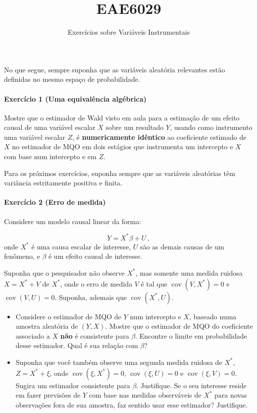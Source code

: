 \documentclass[10pt,a4paper]{article}
\title{EAE6029}
\author{Exercícios sobre Variáveis Instrumentais}
\date{}
\begin{document}
	\maketitle
	No que segue, sempre suponha que as variáveis aleatória relevantes estão definidas no mesmo espaço de probabilidade.
 \paragraph{Exercício 1 (Uma equivalência algébrica)} Mostre que o estimador de Wald visto em aula para a estimação de um efeito causal de uma variável escalar $X$ sobre um resultado $Y$, usando como instrumento uma variável escalar $Z$, é \textbf{numericamente idêntico} ao coeficiente estimado de $X$ no estimador de MQO em dois estágios que instrumenta um intercepto e $X$ com base num intercepto e em $Z$.
 
 \vspace{1em}
 		Para os próximos exercícios, suponha sempre que as variáveis aleatórias têm variância estritamente positiva e finita.
 
	\paragraph{Exercício 2 (Erro de medida)} Considere um modelo causal linear da forma:

$$Y = X^* \beta + U\, ,$$
onde $X^*$ é uma causa escalar de interesse, $U$ são as demais causas de um fenômeno, e $\beta$ é um efeito causal de interesse. 

Suponha que o pesquisador não observe $X^*$, mas somente uma medida ruidosa $X = X^* + V$ de $X^*$, onde o erro de medida $V$ é tal que $\operatorname{cov}(V,X^*) = 0$ e $\operatorname{cov}(V, U)=0$. Suponha, ademais que $\operatorname{cov}(X^*,U)$.

\begin{itemize}
	\item[a] Considere o estimador de MQO de $Y$ num intercepto e $X$, baseado numa amostra aleatória de $(Y,X)$. Mostre que o estimador de MQO do coeficiente associado a $X$ \textbf{não} é consistente para $\beta$. Encontre o limite em probabilidade desse estimador. Qual é sua relação com $\beta$?
	\item[b] Suponha que você também observe uma segunda medida ruidosa de $X^*$, $Z = X^* + \xi$, onde $\operatorname{cov}(\xi, X^*) = 0$, $\operatorname{cov}(\xi, U) = 0$ e $\operatorname{cov}(\xi, V) = 0$. Sugira um estimador consistente para $\beta$. Justifique.	Se o seu interesse reside em fazer previsões de $Y$ com base nas medidas observáveis de $X^*$ para novas observações fora de sua amostra, faz sentido usar esse estimador? Justifique.
\end{itemize}
\end{document}
